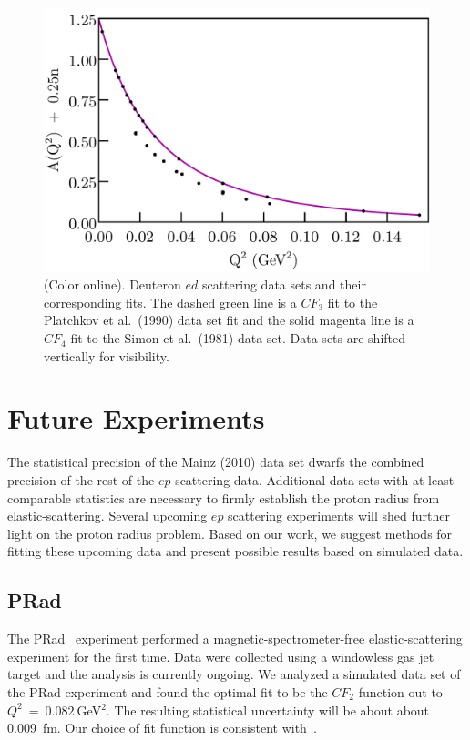 \documentclass[aps,prd,twocolumn,groupedaddress,10pt]{revtex4-1}
\begin{document}
\begin{figure}[h]
\includegraphics[scale=0.40]{deuteron_aggregate_plot}
\caption{(Color online). Deuteron $ed$ scattering data sets and their corresponding fits. The dashed green line is a ${CF}_3$ fit to the Platchkov et al.~(1990) data set fit and the solid magenta line is a ${CF}_4$ fit to the Simon et al.~(1981) data set. Data sets are shifted vertically for visibility. }
\label{deuteron_aggregate}
\end{figure}

\section{Future Experiments}
The statistical precision of the Mainz (2010) data set dwarfs the combined precision of the rest of the $ep$ scattering data. Additional data sets with at least comparable statistics are necessary to firmly establish the proton radius from elastic-scattering. Several upcoming $ep$ scattering experiments will shed further light on the proton radius problem. Based on our work, we suggest methods for fitting these upcoming data and present possible results based on simulated data.

\subsection{PRad}
The PRad~\cite{PRad} experiment performed a magnetic-spectrometer-free elastic-scattering experiment for the first time. Data were collected using a windowless gas jet target and the analysis is currently ongoing. We analyzed a simulated data set of the PRad experiment and found the optimal fit to be the ${CF}_2$ function out to $Q^2~=~0.082~$GeV$^2$. The resulting statistical uncertainty will be about about 0.009~fm. Our choice of fit function is consistent with~\cite{PRad_data}.
\end{document}
